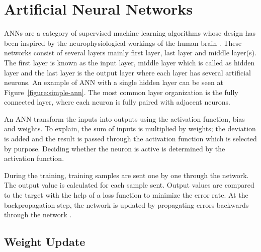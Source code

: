 
\section{Artificial Neural Networks}

    ANNs are a category of supervised machine learning algorithms whose design has been inspired by the neurophysiological workings of the human brain \cite{hill1994artificial}.
    These networks consist of several layers mainly first layer, last layer and middle layer(s).
    The first layer is known as the input layer, middle layer which is called as hidden layer and the last layer is the output layer where each layer has several artificial neurons.
    An example of ANN with a single hidden layer can be seen at Figure~\ref{figure:simple-ann}.
    The most common layer organization is the fully connected layer, where each neuron is fully paired with adjacent neurons.

    An ANN transform the inputs into outputs using the activation function, bias and weights.
    To explain, the sum of inputs is multiplied by weights; the deviation is added and the result is passed through the activation function which is selected by purpose.
    Deciding whether the neuron is active is determined by the activation function.

    

    During the training, training samples are sent one by one through the network.
    The output value is calculated for each sample sent.
    Output values are compared to the target with the help of a loss function to minimize the error rate.
    At the backpropagation step, the network is updated by propagating errors backwards through the network \cite{lecun1988theoretical}.

    \subsection{Weight Update}


